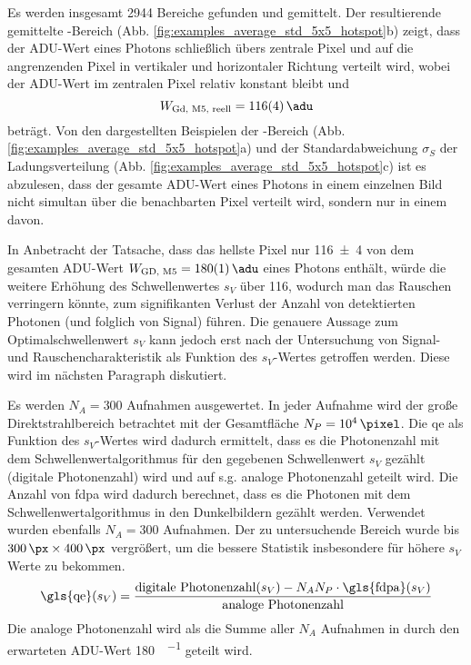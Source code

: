 \noindent
Es werden insgesamt 2944 Bereiche gefunden und gemittelt. Der resultierende gemittelte -Bereich (Abb. \ref{fig:examples_average_std_5x5_hotspot}b) zeigt, dass der ADU-Wert eines Photons schließlich übers zentrale Pixel und auf die angrenzenden Pixel in vertikaler und horizontaler Richtung verteilt wird, wobei der ADU-Wert im zentralen Pixel relativ konstant bleibt und 
\begin{equation}
    W_\text{Gd, M5, reell}  = \SI{116(4)}{\adu} 
\end{equation}
beträgt. Von den dargestellten Beispielen der -Bereich (Abb. \ref{fig:examples_average_std_5x5_hotspot}a) und der Standardabweichung $\sigma_{S}$ der Ladungsverteilung (Abb. \ref{fig:examples_average_std_5x5_hotspot}c) ist es abzulesen, dass der gesamte ADU-Wert eines Photons in einem einzelnen Bild nicht simultan über die benachbarten Pixel verteilt wird, sondern nur in einem davon. 

\noindent
In Anbetracht der Tatsache, dass das hellste Pixel nur \SI{116(4)}{\adu} von dem gesamten ADU-Wert $W_\text{GD, M5} = \SI{180(1)}{\adu}$ eines Photons enthält, würde die weitere Erhöhung des Schwellenwertes $s_V$ über \SI{116}{\adu}, wodurch man das Rauschen verringern könnte, zum signifikanten Verlust der Anzahl von detektierten Photonen (und folglich von Signal) führen. Die genauere Aussage zum Optimalschwellenwert $s_V$ kann jedoch erst nach der Untersuchung von Signal- und Rauschencharakteristik als Funktion des $s_V$-Wertes getroffen werden. Diese wird im nächsten Paragraph diskutiert. 

\noindent
Es werden $N_A = 300$ Aufnahmen ausgewertet. In jeder Aufnahme wird der   große Direktstrahlbereich betrachtet mit der Gesamtfläche $N_P = \SI{1e4}{\pixel}$. Die \gls{qe} als Funktion des $s_V$-Wertes wird dadurch ermittelt, dass es die Photonenzahl mit dem Schwellenwertalgorithmus für den gegebenen Schwellenwert $s_V$ gezählt (digitale Photonenzahl)  wird und auf s.g. analoge Photonenzahl geteilt wird. Die Anzahl von \gls{fdpa} wird dadurch berechnet, dass es die Photonen mit dem Schwellenwertalgorithmus in den Dunkelbildern gezählt werden. Verwendet wurden ebenfalls $N_A = 300$ Aufnahmen. Der zu untersuchende Bereich wurde bis $\qtyproduct{300 x 400}{\px}$ vergrößert, um die bessere Statistik insbesondere für höhere $s_V$ Werte zu bekommen.
\begin{equation}
    \text{\gls{qe}}(s_V) =  \frac{\text{digitale Photonenzahl}(s_V) - N_A N_P \cdot \text{\gls{fdpa}}(s_V)}{\text{analoge Photonenzahl}}
\end{equation}
Die analoge Photonenzahl wird als die Summe aller $N_A$ Aufnahmen in \si{\adu} durch den erwarteten ADU-Wert \SI{180}{\adu\per\photon} geteilt wird.

